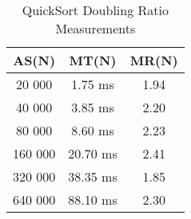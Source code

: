 \begin{table}[hp!]
    \centering
    \begin{tabular} {c | c | c}
        \textbf{AS(N)} & \textbf{MT(N)} & \textbf{MR(N)} \\
        \hline
        20 000 & 1.75 ms & 1.94 \\
        \hline
        40 000 & 3.85 ms & 2.20 \\
        \hline
        80 000 & 8.60 ms & 2.23 \\
        \hline
        160 000 & 20.70 ms & 2.41 \\
        \hline
        320 000 & 38.35 ms & 1.85 \\
        \hline
        640 000 & 88.10 ms & 2.30 \\
    \end{tabular}
    \caption{QuickSort Doubling Ratio Measurements}
\end{table}
